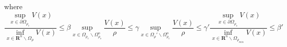 \documentclass[letterpaper, 10pt, conference]{ieeeconf}
\begin{document}
\begin{thm}
\vspace{0.5cm}
	where 
	\begin{subequations}\label{eq:beta}
		\begin{equation}\label{eq:beta1}
		\frac{\sup_{x \in \partial \Omega_{\rho_e}} V(x)}{\inf_{x \in \mathbf{R}^n \backslash \Omega_{\rho}} V(x)} \leq \beta 
		\end{equation}
		\begin{equation}\label{eq:gamma}
		\sup \limits_{x \in \Omega_{\rho_e} \backslash \Omega_{\rho_s}^{\text{o}}}	\frac{V(x)}{\rho} \leq \gamma 
		\end{equation}
		\begin{equation}\label{eq:gamma'}
		\sup \limits_{x \in \Omega_{\rho}' \backslash \Omega_{\rho_e}^\text{o}}	\frac{V(x)}{\rho} \leq \gamma'
		\end{equation}	
		\begin{equation}\label{eq:beta2}
		\frac{\sup_{x \in \partial \Omega_{\rho_s}} V(x)}{\inf_{x \in \mathbf{R}^n \backslash \Omega_{\rho_{min}}} V(x)} \leq \beta' 
		\end{equation}
	\end{subequations}
\end{thm}

\vspace{0.5cm}
\end{document}
